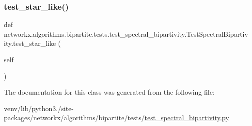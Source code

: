 \subsubsection{\texorpdfstring{test\+\_\+star\+\_\+like()}{test\_star\_like()}}
{\footnotesize\ttfamily def networkx.\+algorithms.\+bipartite.\+tests.\+test\+\_\+spectral\+\_\+bipartivity.\+Test\+Spectral\+Bipartivity.\+test\+\_\+star\+\_\+like (\begin{DoxyParamCaption}\item[{}]{self }\end{DoxyParamCaption})}



The documentation for this class was generated from the following file\+:\begin{DoxyCompactItemize}
\item 
venv/lib/python3./site-\/packages/networkx/algorithms/bipartite/tests/\hyperlink{test__spectral__bipartivity_8py}{test\+\_\+spectral\+\_\+bipartivity.\+py}\end{DoxyCompactItemize}
